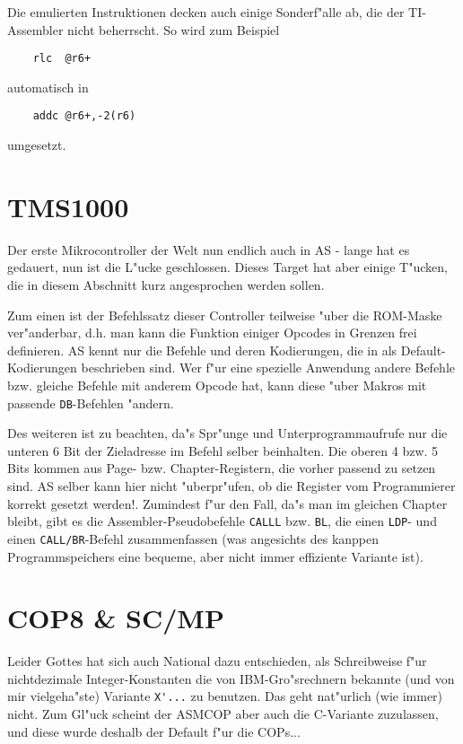 \documentclass[12pt,a4paper,twoside]{report}
\newcommand{\tty}[1]{{\tt #1}}
\begin{document}
{Die emulierten Instruktionen decken auch einige Sonderf"alle ab,
die der TI-Assembler nicht beherrscht.  So wird zum Beispiel
\begin{verbatim}
    rlc  @r6+
\end{verbatim}
automatisch in
\begin{verbatim}
    addc @r6+,-2(r6)
\end{verbatim}
umgesetzt.


\section{TMS1000}

Der erste Mikrocontroller der Welt nun endlich auch in AS - lange hat es
gedauert, nun ist die L"ucke geschlossen.  Dieses Target hat aber einige
T"ucken, die in diesem Abschnitt kurz angesprochen werden sollen.

Zum einen ist der Befehlssatz dieser Controller teilweise "uber die ROM-Maske
ver"anderbar, d.h. man kann die Funktion einiger Opcodes in Grenzen frei
definieren.  AS kennt nur die Befehle und deren Kodierungen, die in
\cite{TMS1000PGMRef} als Default-Kodierungen beschrieben sind.  Wer f"ur eine
spezielle Anwendung andere Befehle bzw. gleiche Befehle mit anderem Opcode
hat, kann diese "uber Makros mit passende \tty{DB}-Befehlen "andern.

Des weiteren ist zu beachten, da"s Spr"unge und Unterprogrammaufrufe nur die
unteren 6 Bit der Zieladresse im Befehl selber beinhalten.  Die oberen 4 bzw.
5 Bits kommen aus Page- bzw. Chapter-Registern, die vorher passend zu setzen
sind.  AS selber kann hier nicht "uberpr"ufen, ob die Register vom Programmierer
korrekt gesetzt werden!.  Zumindest f"ur den Fall, da"s man im gleichen Chapter
bleibt, gibt es die Assembler-Pseudobefehle \tty{CALLL} bzw.
\tty{BL}, die einen \tty{LDP}- und einen \tty{CALL/BR}-Befehl zusammenfassen
(was angesichts des kanppen Programmspeichers eine bequeme, aber nicht immer
effiziente Variante ist).


\section{COP8 \& SC/MP}
\label{COP8Spec}

Leider Gottes hat sich auch National dazu entschieden, als 
Schreibweise f"ur nichtdezimale Integer-Konstanten die von 
IBM-Gro"srechnern bekannte (und von mir vielgeha"ste) Variante 
\verb!X'...! zu benutzen.  Das geht nat"urlich (wie immer) nicht.  
Zum Gl"uck scheint der ASMCOP aber auch die C-Variante zuzulassen, 
und diese wurde deshalb der Default f"ur die COPs...

}
\end{document}
